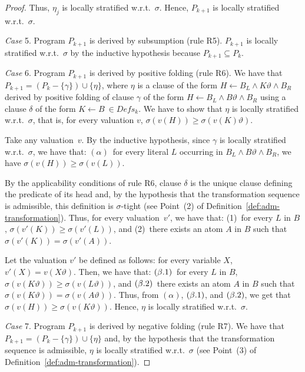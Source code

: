 \documentclass[english]{tlp}
\renewcommand{\mathit}{\displaystyle}
\begin{document}
\begin{proof}
\smallskip

\noindent Thus, \( \eta _{j}\) is locally stratified w.r.t.~\(
\sigma  \). Hence, $P_{k+1}$ is locally stratified w.r.t.~$\sigma$.

\medskip

\noindent \emph{Case} 5. Program \( P_{k+1} \) is derived by
subsumption (rule R5). \( P_{k+1} \) is locally stratified w.r.t.~\(
\sigma  \) by the inductive hypothesis because \( P_{k+1}\subseteq
P_{k} \). 


\medskip

\noindent \emph{Case} 6. Program \( P_{k+1} \) is derived by
positive folding (rule R6). We have that \( P_{k+1}=(P_{k}-\{\gamma
\})\cup \{\eta \} \), where \( \eta  \) is a clause of the form \(
H\leftarrow  B_L\wedge K\vartheta\wedge B_R \) derived by positive
folding of clause \( \gamma \) of the form \( H\leftarrow B_L\wedge
B\vartheta\wedge B_R \) using a clause \( \delta \) of the form \(
K\leftarrow B \ \in \mathit{Defs}_k\). We have to show that $\eta$
is locally stratified w.r.t.~$\sigma$, that is, for every valuation
\(v\), \(\sigma(v(H))\geq \sigma(v(K)\vartheta) \). 

Take any
valuation~$v$. 
By the inductive hypothesis, since $\gamma$ is locally stratified 
w.r.t.~$\sigma$, we have that: $(\alpha)$~for every literal $L$
occurring in $B_L\wedge B\vartheta \wedge B_R$, we have \(\sigma( v(H))\geq
\sigma(v(L))\). 

By the applicability conditions of rule R6, clause
$\delta$ is the unique clause defining the predicate of its head and, by the
hypothesis that the transformation sequence is admissible, this
definition is $\sigma$-tight (see Point~(2) of
Definition~\ref{def:adm-transformation}). Thus, for every
valuation~$v'$, we have that: (1)~for every $L$ in $B$, 
$\sigma(v'(K))\geq \sigma(v'(L))$,
and (2)~there exists an atom $A$ in $B$ such that 
$\sigma(v'(K)) = \sigma(v'(A))$. 


Let the valuation $v'$ be defined as follows: for every variable $X$,
$v'(X)=v(X\vartheta)$. Then, we have that: 
$(\beta.{\rm 1})$~for every $L$ in $B$, $\sigma(v(K\vartheta))\geq \sigma(v(L\vartheta))$,
and $(\beta.{\rm 2})$~there exists an atom $A$ in $B$ such that 
$\sigma(v(K\vartheta)) = \sigma(v(A\vartheta))$. 
Thus, from $(\alpha)$, $(\beta.{\rm 1})$, and $(\beta.{\rm 2})$, we get that
$\sigma(v(H)) \geq \sigma(v(K\vartheta))$. Hence, $\eta$ is locally stratified
w.r.t.~$\sigma$.

\medskip

\noindent \emph{Case} 7. Program \( P_{k+1} \) is derived by
negative folding (rule R7). We have that \( P_{k+1}=(P_{k}-\{\gamma
\})\cup \{\eta \} \) and, by the hypothesis that the transformation
sequence is admissible, \( \eta  \) is locally stratified
w.r.t.~$\sigma$ (see Point~(3) of
Definition~\ref{def:adm-transformation}).
\end{proof}
\end{document}
